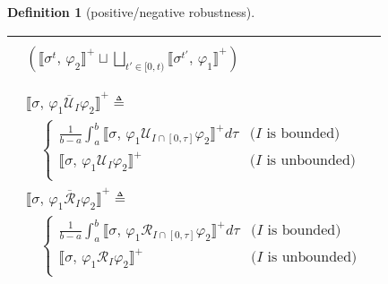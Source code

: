 \documentclass[envcountsect,orivec]{llncs} \usepackage{etex} \usepackage[]{graphicx}
\newtheorem{mydefinition}[mytheorem]{Definition}
\newcommand{\UntilOp}[1]{\mathbin{\mathcal{U}_{#1}}}
\newcommand{\Release}[1]{\mathbin{\mathcal{R}_{#1}}}
\newcommand{\TUntil}[1]{\mathbin{\overline{\mathcal{U}}_{#1}}}
\newcommand{\TRelease}[1]{\mathbin{\overline{\mathcal{R}}_{#1}}}
\newcommand{\Robust}[2]{{ \llbracket #1,\, #2 \rrbracket}}
\newcommand{\Defeq}{\triangleq}
\newcommand{\Vee}[1]{{{\bigsqcup_{#1}}}}
\newcommand{\Frac}[2]{{\displaystyle{\frac{#1}{#2}}}}
\newcommand{\Int}{\displaystyle \int}
\begin{document}
\begin{mydefinition}[positive/negative robustness]
\begin{table}[t]
\begin{tabular}{l}
{\begin{math}
\begin{array}{l}
\begin{array}{rll}
            (\Robust{\sigma^t}{\varphi_2}^{+} \sqcup 
            \Vee{t' \in [0, t)} \Robust{\sigma^{t'}}{\varphi_1}^{+})\\
        \end{array}
        \\
        \begin{array}{l}
          \Robust{\sigma}{\varphi_1 \TUntil{I} \varphi_2}^{+} \Defeq\\
          \quad
          \begin{cases}
            \Frac{1}{b - a} \Int_{a}^{b} 
            \Robust{\sigma}{\varphi_1 \UntilOp{I \cap [0, \tau]} \varphi_2}^{+} d\tau 
            & \text{($I$ is bounded)}\\
            \Robust{\sigma}{\varphi_1 \UntilOp{I} \varphi_2}^{+} 
            & \text{($I$ is unbounded)}\\
          \end{cases}
	  \\
          \Robust{\sigma}{\varphi_1 \TRelease{I} \varphi_2}^{+} \Defeq\\
          \quad
          \begin{cases}
            \Frac{1}{b - a} \Int_{a}^{b} 
            \Robust{\sigma}{\varphi_1 \Release{I \cap [0, \tau]} \varphi_2}^{+} d\tau 
            & \text{($I$ is bounded)}\\
            \Robust{\sigma}{\varphi_1 \Release{I} \varphi_2}^{+} 
            & \text{($I$ is unbounded)}\\
          \end{cases}\\
        \end{array}
      \end{array}
    \end{math}
   }
   \\
   \hline


\end{tabular}
\end{table}
\end{mydefinition}
\end{document}
